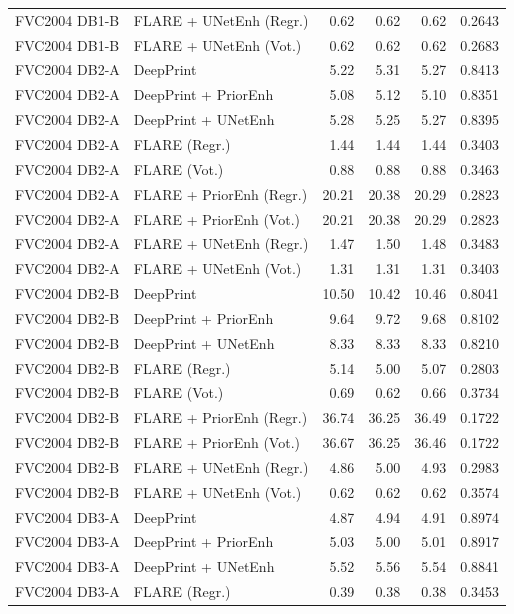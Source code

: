 {\begin{longtable}{llrrrr}
FVC2004 DB1-B & FLARE + UNetEnh (Regr.) & 0.62 & 0.62 & 0.62 & 0.2643 \\
FVC2004 DB1-B & FLARE + UNetEnh (Vot.) & 0.62 & 0.62 & 0.62 & 0.2683 \\
\midrule
FVC2004 DB2-A & DeepPrint & 5.22 & 5.31 & 5.27 & 0.8413 \\
FVC2004 DB2-A & DeepPrint + PriorEnh & 5.08 & 5.12 & 5.10 & 0.8351 \\
FVC2004 DB2-A & DeepPrint + UNetEnh & 5.28 & 5.25 & 5.27 & 0.8395 \\
FVC2004 DB2-A & FLARE (Regr.) & 1.44 & 1.44 & 1.44 & 0.3403 \\
FVC2004 DB2-A & FLARE (Vot.) & 0.88 & 0.88 & 0.88 & 0.3463 \\
FVC2004 DB2-A & FLARE + PriorEnh (Regr.) & 20.21 & 20.38 & 20.29 & 0.2823 \\
FVC2004 DB2-A & FLARE + PriorEnh (Vot.) & 20.21 & 20.38 & 20.29 & 0.2823 \\
FVC2004 DB2-A & FLARE + UNetEnh (Regr.) & 1.47 & 1.50 & 1.48 & 0.3483 \\
FVC2004 DB2-A & FLARE + UNetEnh (Vot.) & 1.31 & 1.31 & 1.31 & 0.3403 \\
\midrule
FVC2004 DB2-B & DeepPrint & 10.50 & 10.42 & 10.46 & 0.8041 \\
FVC2004 DB2-B & DeepPrint + PriorEnh & 9.64 & 9.72 & 9.68 & 0.8102 \\
FVC2004 DB2-B & DeepPrint + UNetEnh & 8.33 & 8.33 & 8.33 & 0.8210 \\
FVC2004 DB2-B & FLARE (Regr.) & 5.14 & 5.00 & 5.07 & 0.2803 \\
FVC2004 DB2-B & FLARE (Vot.) & 0.69 & 0.62 & 0.66 & 0.3734 \\
FVC2004 DB2-B & FLARE + PriorEnh (Regr.) & 36.74 & 36.25 & 36.49 & 0.1722 \\
FVC2004 DB2-B & FLARE + PriorEnh (Vot.) & 36.67 & 36.25 & 36.46 & 0.1722 \\
FVC2004 DB2-B & FLARE + UNetEnh (Regr.) & 4.86 & 5.00 & 4.93 & 0.2983 \\
FVC2004 DB2-B & FLARE + UNetEnh (Vot.) & 0.62 & 0.62 & 0.62 & 0.3574 \\
\midrule
FVC2004 DB3-A & DeepPrint & 4.87 & 4.94 & 4.91 & 0.8974 \\
FVC2004 DB3-A & DeepPrint + PriorEnh & 5.03 & 5.00 & 5.01 & 0.8917 \\
FVC2004 DB3-A & DeepPrint + UNetEnh & 5.52 & 5.56 & 5.54 & 0.8841 \\
FVC2004 DB3-A & FLARE (Regr.) & 0.39 & 0.38 & 0.38 & 0.3453 \\

\end{longtable}}
